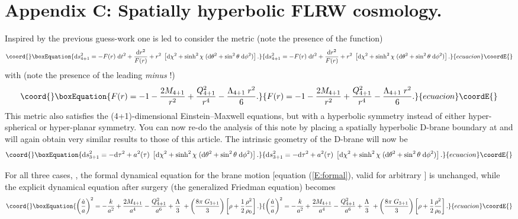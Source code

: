 \documentclass[a4paper,12pt]{article}
\begin{document}
\section*{Appendix C: Spatially hyperbolic FLRW cosmology.}


Inspired by the previous guess-work one is led to consider the metric
(note the presence of the \myHighlight{$\sinh$}\coordHE{} function)
%
\begin{equation}\coord{}\boxEquation{
\d s^2_{4+1} = 
-  F(r)\; \d t^2 
+{\d r^2\over F(r)} 
+ r^2 \; \left[\d\chi^2 + 
\sinh^2\chi \; (\d\theta^2 + \sin^2\theta \; \d\phi^2)\right].
}{
\d s^2_{4+1} = 
-  F(r)\; \d t^2 
+{\d r^2\over F(r)} 
+ r^2 \; \left[\d\chi^2 + 
\sinh^2\chi \; (\d\theta^2 + \sin^2\theta \; \d\phi^2)\right].
}{ecuacion}\coordE{}\end{equation}
%
with (note the presence of the leading {\em minus} \coordHE{}!)
%
\begin{equation}\coord{}\boxEquation{
F(r) =  -1- {2M_{4+1}\over r^2} 
+ {Q_{4+1}^2\over r^4} - {\Lambda_{4+1} \; r^2\over 6}.
}{
F(r) =  -1- {2M_{4+1}\over r^2} 
+ {Q_{4+1}^2\over r^4} - {\Lambda_{4+1} \; r^2\over 6}.
}{ecuacion}\coordE{}\end{equation}
%
This metric also satisfies the (4+1)-dimensional Einstein--Maxwell
equations, but with a hyperbolic symmetry instead of either
hyper-spherical or hyper-planar symmetry. You can now re-do the
analysis of this note by placing a spatially hyperbolic D-brane
boundary at \coordHE{} and will again obtain very similar results to
those of this article.  The intrinsic geometry of the D-brane will now
be
%
\begin{equation}\coord{}\boxEquation{
\d s^2_{3+1} = - \d \tau^2  + a^2(\tau) \;  \left[\d\chi^2 + 
\sinh^2\chi \; (\d\theta^2 + \sin^2\theta \; \d\phi^2)\right].
}{
\d s^2_{3+1} = - \d \tau^2  + a^2(\tau) \;  \left[\d\chi^2 + 
\sinh^2\chi \; (\d\theta^2 + \sin^2\theta \; \d\phi^2)\right].
}{ecuacion}\coordE{}\end{equation}

For all three cases, \coordHE{}, the formal dynamical equation for
the brane motion [equation (\ref{E:formal}), valid for arbitrary
\coordHE{}] is unchanged, while the explicit dynamical equation after
{\RNdS} surgery (the generalized Friedman equation) becomes
%
\begin{equation}\coord{}\boxEquation{
\left({\dot a \over a}\right)^2 = 
- {k\over a^2} 
+ {2M_{4+1}\over a^4} 
-  {Q_{4+1}^2\over a^6} 
+ {\Lambda\over 3}\;
+\left({ 8\pi \; G_{3+1}\over3}\right) 
\left[\rho + \half {\rho^2\over\rho_0} \right]. 
}{
\left({\dot a \over a}\right)^2 = 
- {k\over a^2} 
+ {2M_{4+1}\over a^4} 
-  {Q_{4+1}^2\over a^6} 
+ {\Lambda\over 3}\;
+\left({ 8\pi \; G_{3+1}\over3}\right) 
\left[\rho + \half {\rho^2\over\rho_0} \right]. 
}{ecuacion}\coordE{}\end{equation}
%
\end{document}
